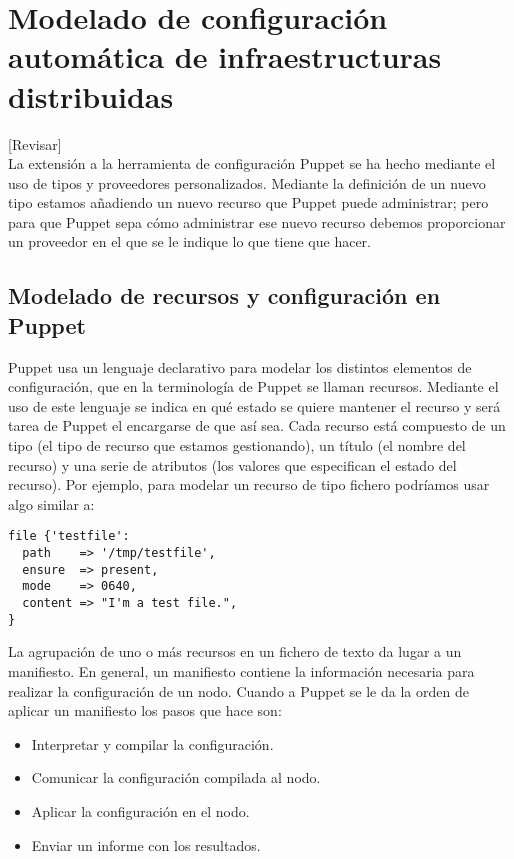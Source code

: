 \chapter{Modelado de configuración automática de infraestructuras distribuidas}
\label{cap:modelado}

[Revisar]\\

La extensión a la herramienta de configuración Puppet se ha hecho mediante el uso de tipos y proveedores personalizados. Mediante la definición de un nuevo tipo estamos añadiendo un nuevo recurso que Puppet puede administrar; pero para que Puppet sepa cómo administrar ese nuevo recurso debemos proporcionar un proveedor en el que se le indique lo que tiene que hacer.


\section{Modelado de recursos y configuración en Puppet}

Puppet usa un lenguaje declarativo para modelar los distintos elementos de configuración, que en la terminología de Puppet se llaman recursos. Mediante el uso de este lenguaje se indica en qué estado se quiere mantener el recurso y será tarea de Puppet el encargarse de que así sea. Cada recurso está compuesto de un tipo (el tipo de recurso que estamos gestionando), un título (el nombre del recurso) y una serie de atributos (los valores que especifican el estado del recurso). Por ejemplo, para modelar un recurso de tipo fichero podríamos usar algo similar a:

\begin{lstlisting}
file {'testfile':
  path    => '/tmp/testfile',
  ensure  => present,
  mode    => 0640,
  content => "I'm a test file.",
}
\end{lstlisting}

La agrupación de uno o más recursos en un fichero de texto da lugar a un manifiesto. En general, un manifiesto contiene la información necesaria para realizar la configuración de un nodo. Cuando a Puppet se le da la orden de aplicar un manifiesto los pasos que hace son:
\begin{itemize}
\item Interpretar y compilar la configuración.
\item Comunicar la configuración compilada al nodo.
\item Aplicar la configuración en el nodo.
\item Enviar un informe con los resultados.
\end{itemize}


